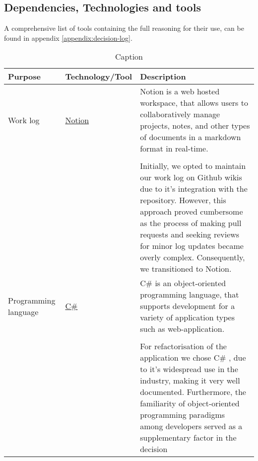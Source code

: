 \subsection{Dependencies, Technologies and tools}


A comprehensive list of tools containing the full reasoning for their use, can be found in appendix \ref{appendix:decision-log}.\\

\begin{table}[H]
    \centering
    \begin{tabular}{|p{}|p{} | p{}|}
        \hline
        \textbf{Purpose} & \textbf{Technology/Tool} & \textbf{Description}\\
        \hline
         Work log & \href{https://www.notion.so/help/guides/category/documentation}{Notion} & Notion is a web hosted workspace, that allows users to collaboratively manage projects, notes, and other types of documents in a markdown format in real-time.\\
         &&\\
         && Initially, we opted to maintain our work log on Github wikis due to it's integration with the repository. However, this approach proved cumbersome as the process of making pull requests and seeking reviews for minor log updates became overly complex. Consequently, we transitioned to Notion.\\ 
         \hline
         Programming language & \href{https://learn.microsoft.com/en-us/dotnet/csharp/}{C\#} &
         C\#  is an object-oriented programming language, that supports development for a variety of application types such as web-application.\\
         && \\
         && For refactorisation of the application we chose C\# , due to it's widespread use in the industry, making it very well documented. Furthermore, the familiarity of object-oriented programming paradigms among developers served as a supplementary factor in the decision\\
         \hline
    \end{tabular}
    \caption{Caption}
    \label{tab:tools1}
\end{table}
